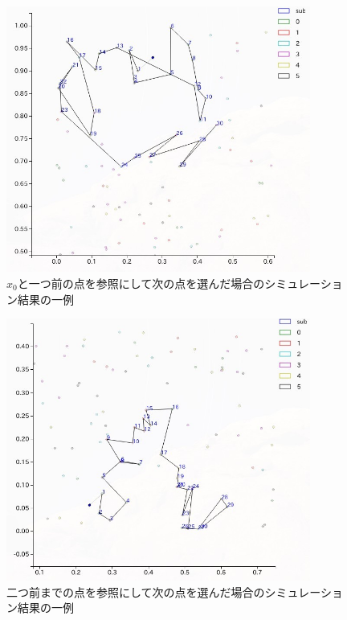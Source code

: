 \begin{figure}[H]
    \begin{center}
        \includegraphics[width=10cm]{../simple3/case_4.jpg}
        \caption{$x_{0}$と一つ前の点を参照にして次の点を選んだ場合のシミュレーション結果の一例}
        \label{fig:f11}
    \end{center}
\end{figure}
\begin{figure}[H]
    \begin{center}
        \includegraphics[width=10cm]{../simple3/case_5.jpg}
        \caption{二つ前までの点を参照にして次の点を選んだ場合のシミュレーション結果の一例}
        \label{fig:f12}
    \end{center}
\end{figure}
